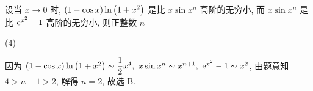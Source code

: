 \begin{example}[2001 数二]
    设当 $x\to0 $ 时, $(1-\cos x)\ln\qty(1+x^2)$ 是比 $x\sin x^n$ 高阶的无穷小, 而 $x\sin x^n$ 是比 $\mathrm{e} ^{x^2}-1$ 高阶的无穷小, 则正整数 $n$ 
    \begin{tasks}(4)
    \end{tasks}
\end{example}
\begin{solution}
    因为 $(1-\cos x)\ln\qty(1+x^2)\sim\dfrac{1}{2}x^4,~x\sin x^n\sim x^{n+1},~\mathrm{e} ^{x^2}-1\sim x^2$, 由题意知 $4>n+1>2$, 解得 $n=2$, 故选 B.
\end{solution}
